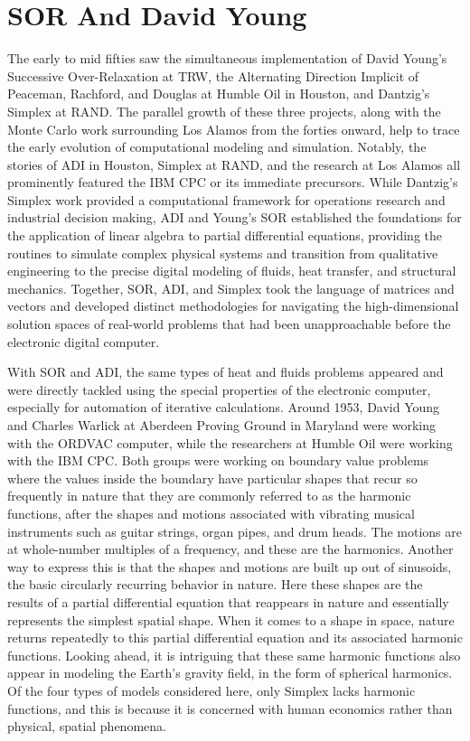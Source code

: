 \chapter{SOR And David Young}

The early to mid fifties saw the simultaneous implementation of David Young’s Successive Over-Relaxation at TRW, the Alternating Direction Implicit of Peaceman, Rachford, and Douglas at Humble Oil in Houston, and Dantzig’s Simplex at RAND. The parallel growth of these three projects, along with the Monte Carlo work surrounding Los Alamos from the forties onward, help to trace the early evolution of computational modeling and simulation. Notably, the stories of ADI in Houston, Simplex at RAND, and the research at Los Alamos all prominently featured the IBM CPC or its immediate precursors. While Dantzig’s Simplex work provided a computational framework for operations research and industrial decision making, ADI and Young’s SOR established the foundations for the application of linear algebra to partial differential equations, providing the routines to simulate complex physical systems and transition from qualitative engineering to the precise digital modeling of fluids, heat transfer, and structural mechanics. Together, SOR, ADI, and Simplex took the language of matrices and vectors and developed distinct methodologies for navigating the high-dimensional solution spaces of real-world problems that had been unapproachable before the electronic digital computer. \cite{metropolisMonteCarloMethod1949} \cite{orchard-haysEvolutionLinearProgramming1958}

With SOR and ADI, the same types of heat and fluids problems appeared and were directly tackled using the special properties of the electronic computer, especially for automation of iterative calculations. Around 1953, David Young and Charles Warlick at Aberdeen Proving Ground in Maryland were working with the ORDVAC computer, while the researchers at Humble Oil were working with the IBM CPC. Both groups were working on boundary value problems where the values inside the boundary have particular shapes that recur so frequently in nature that they are commonly referred to as the harmonic functions, after the shapes and motions associated with vibrating musical instruments such as guitar strings, organ pipes, and drum heads. The motions are at whole-number multiples of a frequency, and these are the harmonics. Another way to express this is that the shapes and motions are built up out of sinusoids, the basic circularly recurring behavior in nature. Here these shapes are the results of a partial differential equation that reappears in nature and essentially represents the simplest spatial shape. When it comes to a shape in space, nature returns repeatedly to this partial differential equation and its associated harmonic functions. Looking ahead, it is intriguing that these same harmonic functions also appear in modeling the Earth's gravity field, in the form of spherical harmonics. Of the four types of models considered here, only Simplex lacks harmonic functions, and this is because it is concerned with human economics rather than physical, spatial phenomena. \cite{youngIterativeMethodsSolving1954} \cite{peacemanNumericalSolutionParabolic1955a}

